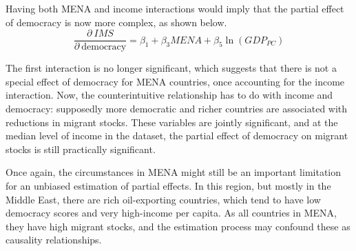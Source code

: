 \documentclass[../main.tex]{subfiles}
\begin{document}
Having both MENA and income interactions would imply that the partial effect of democracy is now more complex, as shown below. 
\begin{equation}
    \frac{\partial \ IMS}{\partial \ \text{democracy}} = \beta_1+\beta_3 MENA +\beta_5 \ln (GDP_{PC})
    \label{eqn:4}
\end{equation}

The first interaction is no longer significant, which suggests that there is not a special effect of democracy for MENA countries, once accounting for the income interaction. Now, the counterintuitive relationship has to do with income and democracy: supposedly more democratic and richer countries are associated with reductions in migrant stocks. These variables are jointly significant, and at the median level of income in the dataset, the partial effect of democracy on migrant stocks is still practically significant. 

Once again, the circumstances in MENA might still be an important limitation for an unbiased estimation of partial effects. In this region, but mostly in the Middle East, there are rich oil-exporting countries, which tend to have low democracy scores and very high-income per capita. As all countries in MENA, they have high migrant stocks, and the estimation process may confound these as causality relationships.
\end{document}
